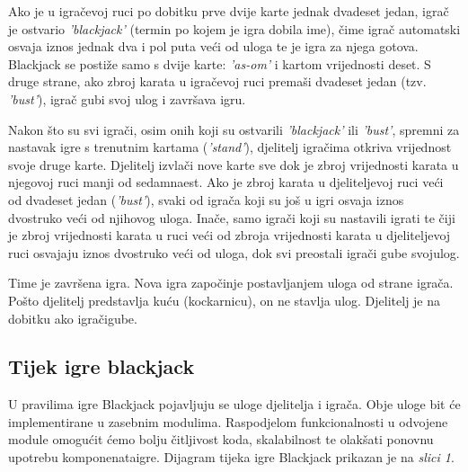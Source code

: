 \documentclass[conference]{IEEEtran}
\begin{document}
Ako je u igračevoj ruci po dobitku prve dvije karte jednak dvadeset jedan, igrač je ostvario \textit{'blackjack'} (termin po kojem je igra dobila ime), čime igrač automatski osvaja iznos jednak dva i pol puta veći od uloga te je igra za njega gotova. Blackjack se postiže samo s dvije karte: \textit{'as-om'} i kartom vrijednosti deset. S druge strane, ako zbroj karata u igračevoj ruci premaši  dvadeset jedan (tzv. \textit{'bust'}), igrač gubi svoj ulog i završava igru. 

Nakon što su svi igrači, osim onih koji su ostvarili \textit{'blackjack'} ili \textit{'bust'}, spremni za nastavak igre s trenutnim kartama (\textit{'stand'}), djelitelj igračima otkriva vrijednost svoje druge karte. Djelitelj izvlači nove karte sve dok je zbroj vrijednosti karata u njegovoj ruci manji od sedamnaest. Ako je zbroj karata u djeliteljevoj ruci veći od dvadeset jedan (\textit{'bust'}), svaki od igrača koji su još u igri osvaja iznos dvostruko veći od njihovog uloga. Inače, samo igrači koji su nastavili igrati te čiji je zbroj vrijednosti karata u ruci veći od zbroja vrijednosti karata u djeliteljevoj ruci osvajaju iznos dvostruko veći od uloga, dok svi preostali igrači gube svoj\break ulog. 

Time je završena igra. Nova igra započinje postavljanjem uloga od strane igrača. Pošto djelitelj predstavlja kuću (kockarnicu), on ne stavlja ulog. Djelitelj je na dobitku ako igrači\break gube.

\newpage

\subsection{Tijek igre blackjack}

U pravilima igre Blackjack pojavljuju se uloge djelitelja i igrača. Obje uloge bit će implementirane u zasebnim modulima. Raspodjelom funkcionalnosti u odvojene module omogućit ćemo bolju čitljivost koda, skalabilnost te olakšati ponovnu upotrebu komponenata\break igre. Dijagram tijeka igre Blackjack prikazan je na \textit{slici 1}.
\end{document}
